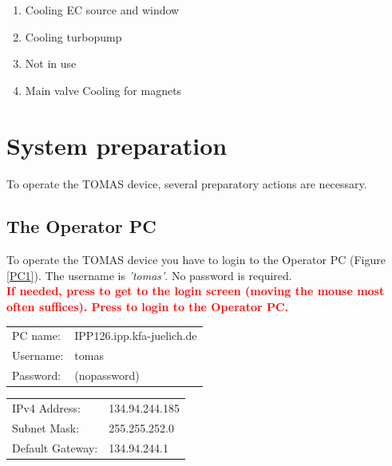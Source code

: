 \documentclass[fleqn,a4paper,20pt]{article}
\begin{document}
\begin{enumerate}
	\item Cooling EC source and window
	\item Cooling turbopump
	\item Not in use
	\item Main valve Cooling for magnets
\end{enumerate}


\newpage
\section{System preparation}%

To operate the TOMAS device, several preparatory actions are necessary.

\begin{minipage}{.7\textwidth}
\subsection{The Operator PC} To operate the TOMAS device you have to login to the Operator PC (Figure \ref{PC1}). The username is \textit{'tomas'}. No password is required.\\

\textcolor{red}{\textbf{If needed, press \keys{\ctrl + \Alt + \del} to get to the login screen (moving the mouse most often suffices). Press \keys{\enter} to login to the Operator PC. }}\\

\begin{minipage}{.48\textwidth}
\begin{tabular}{ll}
	PC name: &IPP126.ipp.kfa-juelich.de\\
	Username: &tomas\\
	Password: &(nopassword)
\end{tabular}
\end{minipage}
\begin{minipage}{.48\textwidth}
	\begin{tabular}{ll}
		IPv4 Address: &134.94.244.185\\
		Subnet Mask:& 255.255.252.0\\
		Default Gateway:& 134.94.244.1
	\end{tabular}
\end{minipage}
\end{minipage}
\end{document}
